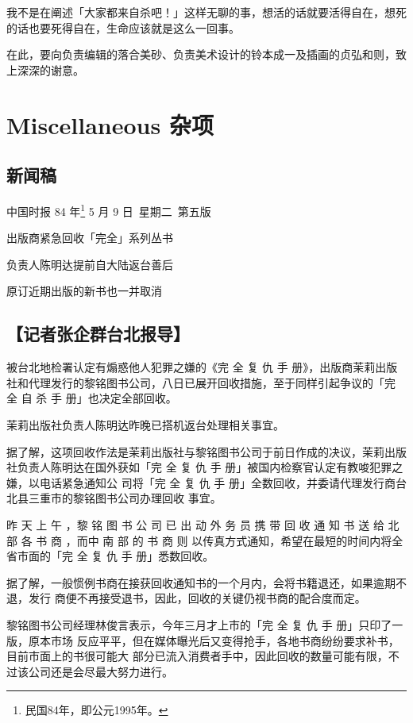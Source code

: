 \documentclass[UTF8]{ctexart}
\begin{document}
我不是在阐述「大家都来自杀吧！」这样无聊的事，想活的话就要活得自在，想死的话也要死得自在，生命应该就是这么一回事。

在此，要向负责编辑的落合美砂、负责美术设计的铃本成一及插画的贞弘和则，致上深深的谢意。


\newpage

\section{Miscellaneous 杂项}

\subsection*{新闻稿}

中国时报 84 年\footnote{民国84年，即公元1995年。} 5 月 9 日\ 星期二\ 第五版

出版商紧急回收「完全」系列丛书

负责人陈明达提前自大陆返台善后

原订近期出版的新书也一并取消

\subsection*{【记者张企群台北报导】}

被台北地检署认定有煽惑他人犯罪之嫌的《完
全%
复%
仇%
手%
册》，出版商茉莉出版社和代理发行的黎铭图书公司，八日已展开回收措施，至于同样引起争议的「完
全%
自%
杀%
手%
册」也决定全部回收。

茉莉出版社负责人陈明达昨晚已搭机返台处理相关事宜。

据了解，这项回收作法是茉莉出版社与黎铭图书公司于前日作成的决议，茉莉出版社负责人陈明达在国外获如「完
全%
复%
仇%
手%
册」被国内检察官认定有教唆犯罪之嫌，以电话紧急通知公 司将「完%
全%
复%
仇%
手%
册」全数回收，并委请代理发行商台北县三重市的黎铭图书公司办理回收 事宜。

昨 天 上 午 ，黎 铭 图 书 公 司 已 出 动 外 务 员 携 带 回 收 通 知 书 送 给 北 部 各 书 商 ，而中 南 部 的 书 商 则 以传真方式通知，希望在最短的时间内将全省市面的「完%
全%
复%
仇%
手%
册」悉数回收。

据了解，一般惯例书商在接获回收通知书的一个月内，会将书籍退还，如果逾期不退，发行
商便不再接受退书，因此，回收的关键仍视书商的配合度而定。

黎铭图书公司经理林俊言表示，今年三月才上市的「完
全%
复%
仇%
手%
册」只印了一版，原本市场
反应平平，但在媒体曝光后又变得抢手，各地书商纷纷要求补书，目前市面上的书很可能大
部分已流入消费者手中，因此回收的数量可能有限，不过该公司还是会尽最大努力进行。
\end{document}
